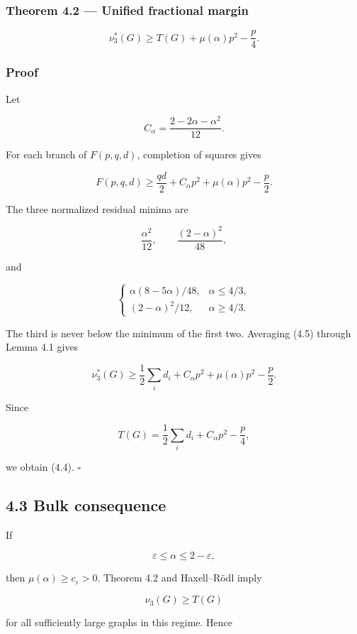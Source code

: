 \documentclass[11pt,a4paper]{article}
\begin{document}
\subsubsection{Theorem 4.2 --- Unified fractional margin}\label{theorem-4.2-unified-fractional-margin}

\[
\boxed{
\nu_3^*(G)
\ge
T(G)+\mu(\alpha)p^2-\frac p4.
}
\tag{4.4}
\]

\subsubsection{Proof}\label{proof-2}

Let

\[
C_\alpha=\frac{2-2\alpha-\alpha^2}{12}.
\]

For each branch of \(F(p,q,d)\), completion of squares gives

\[
F(p,q,d)
\ge
\frac{qd}{2}+C_\alpha p^2+\mu(\alpha)p^2-\frac p2.
\tag{4.5}
\]

The three normalized residual minima are

\[
\frac{\alpha^2}{12},
\qquad
\frac{(2-\alpha)^2}{48},
\]

and

\[
\begin{cases}
\alpha(8-5\alpha)/48,&\alpha\le4/3,\\
(2-\alpha)^2/12,&\alpha\ge4/3.
\end{cases}
\]

The third is never below the minimum of the first two. Averaging (4.5) through Lemma 4.1 gives

\[
\nu_3^*(G)
\ge
\frac12\sum_i d_i+C_\alpha p^2+\mu(\alpha)p^2-\frac p2.
\]

Since

\[
T(G)=\frac12\sum_i d_i+C_\alpha p^2-\frac p4,
\]

we obtain (4.4). \(\square\)

\subsection{4.3 Bulk consequence}\label{bulk-consequence}

If

\[
\varepsilon\le\alpha\le2-\varepsilon,
\]

then \(\mu(\alpha)\ge c_\varepsilon>0\). Theorem 4.2 and Haxell--Rödl imply

\[
\nu_3(G)\ge T(G)
\]

for all sufficiently large graphs in this regime. Hence
\end{document}
